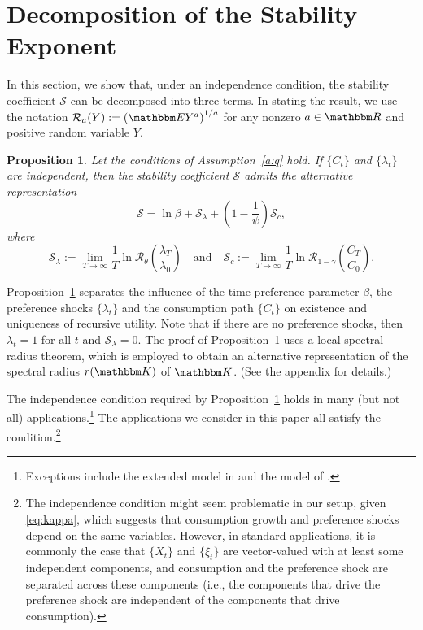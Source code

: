 \documentclass[12pt, reqno]{amsart}
\newcommand{\1}{\mathbbm 1}
\newcommand{\rR}{\mathcal R}
\newcommand{\sS}{\mathscr S}
\newcommand{\RR}{\mathbbm R}
\newcommand{\KK}{\mathbbm K}
\newcommand{\EE}{\mathbbm E}
\theoremstyle{plain}
\newtheorem{proposition}[theorem]{Proposition}
\theoremstyle{definition}
\begin{document}
\section{Decomposition of the Stability Exponent}\label{stab_coef}

In this section, we show that, under an independence condition, the stability
coefficient $\sS$ can be decomposed into three terms.  In stating the result, we
use the notation
    $\rR_a (Y) := \left(\EE Y^a \right)^{1/a}$
for any nonzero $a \in \RR$ and positive random variable $Y$.


\begin{proposition}\label{p:d}
    Let the conditions of Assumption~\ref{a:q} hold.  If $\{ C_t \}$ and $\{
    \lambda_t \}$ are independent, then the stability coefficient $\sS$ admits
    the alternative representation
    \begin{equation}\label{eq:la}
        \sS = \ln \beta 
            + \sS_\lambda 
            + \left(1-\frac{1}{\psi}\right) \sS_c,
    \end{equation}
    where
    \begin{equation}\label{eq:mm}
        \sS_\lambda
        := \lim_{T \to \infty}
        \frac{1}{T} \ln 
        \rR_\theta \left( \frac{\lambda_T}{\lambda_0} \right)
        \quad \text{and} \quad
        \sS_c
        := \lim_{T \to \infty}
        \frac{1}{T} \ln 
        \rR_{1-\gamma} \left( \frac{C_T}{C_0} \right).
    \end{equation}
\end{proposition}

Proposition~\ref{p:d} separates the influence of the time preference parameter
$\beta$, the preference shocks $\{ \lambda_t \}$ and the consumption path $\{
C_t \}$ on existence and uniqueness of recursive utility. Note that if there are no
preference shocks, then $\lambda_t = 1$ for all $t$ and $\sS_\lambda = 0$. The proof of
Proposition~\ref{p:d} uses a local spectral radius theorem, which is employed
to obtain an alternative representation of the spectral radius $r(\KK)$ of
$\KK$.  (See the appendix for details.)

The independence condition required by Proposition~\ref{p:d} holds in many
(but not all) applications.\footnote{Exceptions include the extended model in
    \cite{Albuquerque2016} and the model of \cite{creal2020bond}.} The
    applications we consider in this paper all satisfy the condition.\footnote{The
        independence condition might seem problematic in our setup, given
        \eqref{eq:kappa}, which suggests that consumption growth and
        preference shocks depend on the same variables. However, in standard
        applications, it is commonly the case that $\{X_t\}$ and $\{\xi_t\}$
        are vector-valued with at least some independent components, and
        consumption and the preference shock are separated across these
    components (i.e., the components that drive the preference shock are
independent of the components that drive consumption).}
\end{document}
